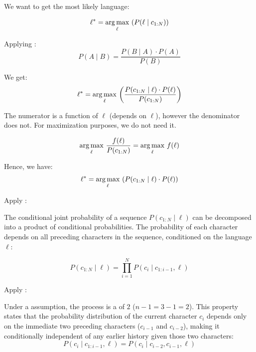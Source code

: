 



We want to get the most likely language:

\[
\ell^{*} = \mathop{\mathrm{arg\,max}}_{\ell}\, \left( P(\ell \mid c_{1:N}) \right)
\]

Applying :
\[
P(A \mid B) = \frac{P(B \mid A) \cdot P(A)}{P(B)}
\]

We get:
\[
\ell^{*} = \mathop{\mathrm{arg\,max}}_{\ell}\, \left( \frac{P(c_{1:N} \mid \ell) \cdot P(\ell)}{P(c_{1:N})} \right)
\]

The numerator is a function of $\ell$ (depends on $\ell$), however the denominator does not. For maximization purposes, we do not need it. 

\[
\mathop{\mathrm{arg\,max}}_{\ell}\, \frac{f(\ell)}{P(c_{1:N})} = \mathop{\mathrm{arg\,max}}_{\ell}\, f(\ell)
\]

Hence, we have:
\[
\ell^{*} = \mathop{\mathrm{arg\,max}}_{\ell}\, \left( P(c_{1:N} \mid \ell) \cdot P(\ell) \right)
\]

Apply :


The conditional joint probability of a sequence $P(c_{1:N} \mid \ell)$ can be decomposed into a product of conditional probabilities. The probability of each character depends on all preceding characters in the sequence, conditioned on the language $\ell$:

\[
P(c_{1:N} \mid \ell) = \prod_{i=1}^{N} P(c_i \mid c_{1:i-1}, \ell)
\]

Apply :

Under a  assumption, the process is a  of   $2$ ($n-1 = 3-1 = 2$). This property states that the probability distribution of the current character $c_i$ depends only on the immediate two preceding characters ($c_{i-1}$ and $c_{i-2}$), making it conditionally independent of any earlier history given those two characters:
\[
P(c_i \mid c_{1:i-1}, \ell) = P(c_i \mid c_{i-2}, c_{i-1}, \ell)
\]

